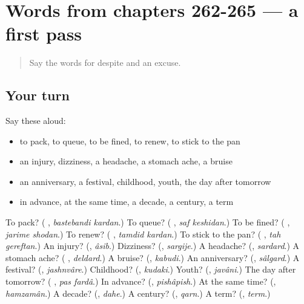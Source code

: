 \section[(dialogue)]{Words from chapters 262-265 — a first pass}

\label{lesson:FA-R270-first-pass-words-from-chapters-262-265}



\begin{quote}
Say the words for despite and an excuse.
\end{quote}

\subsection*{Your turn}
Say these aloud:

\begin{itemize}
\raggedright
  \item to pack, to queue, to be fined, to renew, to stick to the pan
  \item an injury, dizziness, a headache, a stomach ache, a bruise
  \item an anniversary, a festival, childhood, youth, the day after tomorrow
  \item in advance, at the same time, a decade, a century, a term
\end{itemize}

\begin{tcolorbox}[breakable,colback=teal!4,colframe=teal!35!black,title={Before you move on}]
To pack? (\textbf{  }, \emph{bastebandi kardan}.) To queue? (\textbf{ }, \emph{saf keshidan}.) To be fined? (\textbf{ }, \emph{jarime shodan}.) To renew? (\textbf{ }, \emph{tamdid kardan}.) To stick to the pan? (\textbf{ }, \emph{tah gereftan}.) An injury? (\textbf{}, \emph{âsib}.) Dizziness? (\textbf{}, \emph{sargije}.) A headache? (\textbf{}, \emph{sardard}.) A stomach ache? (\textbf{ }, \emph{deldard}.) A bruise? (\textbf{}, \emph{kabudi}.) An anniversary? (\textbf{}, \emph{sâlgard}.) A festival? (\textbf{}, \emph{jashnvâre}.) Childhood? (\textbf{}, \emph{kudaki}.) Youth? (\textbf{}, \emph{javâni}.) The day after tomorrow? (\textbf{ }, \emph{pas fardâ}.) In advance? (\textbf{}, \emph{pishâpish}.) At the same time? (\textbf{}, \emph{hamzamân}.) A decade? (\textbf{}, \emph{dahe}.) A century? (\textbf{}, \emph{qarn}.) A term? (\textbf{}, \emph{term}.)
\end{tcolorbox}
